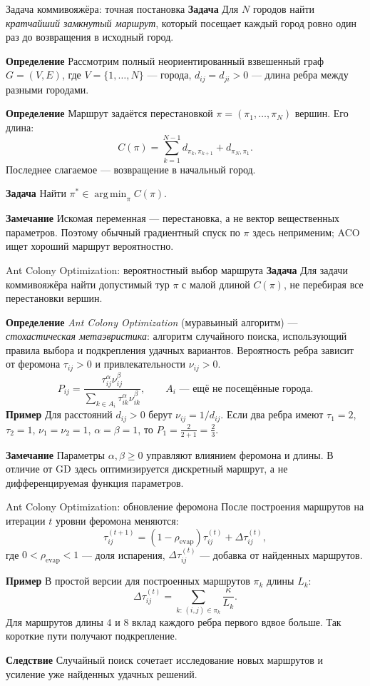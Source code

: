 \documentclass[10pt]{beamer}
\newcommand{\mlBody}{\normalsize}
\newcommand{\mlDefinition}{\textcolor{defblue}{\bfseries Определение}}
\newcommand{\mlRemark}{\textcolor{defblue}{\bfseries Замечание}}
\newcommand{\mlConsequence}{\textcolor{defblue}{\bfseries Следствие}}
\newcommand{\mlTask}{\textcolor{defblue}{\bfseries Задача}}
\newcommand{\mlExample}{\textcolor{defblue}{\bfseries Пример}}
\begin{document}
\begin{frame}{Задача коммивояжёра: точная постановка}
\mlBody
\mlTask\; Для $N$ городов найти \emph{кратчайший замкнутый маршрут},
который посещает каждый город ровно один раз до возвращения
в исходный город.

\mlDefinition\; Рассмотрим полный неориентированный взвешенный граф
$G=(V,E)$, где $V=\{1,\ldots,N\}$ --- города,
$d_{ij}=d_{ji}>0$ --- длина ребра между разными городами.

\mlDefinition\; Маршрут задаётся перестановкой
$\pi=(\pi_1,\ldots,\pi_N)$ вершин. Его длина:
\[
 \boxed{C(\pi)=\sum_{k=1}^{N-1}d_{\pi_k,\pi_{k+1}}
             +d_{\pi_N,\pi_1}}.
\]
Последнее слагаемое --- возвращение в начальный город.

\mlTask\; Найти $\pi^*\in\operatorname*{arg\,min}_{\pi}C(\pi)$.

\mlRemark\; Искомая переменная --- перестановка, а не вектор
вещественных параметров. Поэтому обычный градиентный спуск
по $\pi$ здесь неприменим; ACO ищет хороший маршрут вероятностно.
\end{frame}

\begin{frame}{Ant Colony Optimization: вероятностный выбор маршрута}
\mlBody
\mlTask\; Для задачи коммивояжёра найти допустимый тур $\pi$
с малой длиной $C(\pi)$, не перебирая все перестановки вершин.

\mlDefinition\; \textit{Ant Colony Optimization} (муравьиный алгоритм)
--- \emph{стохастическая метаэвристика}: алгоритм случайного поиска,
использующий правила выбора и подкрепления удачных вариантов.
Вероятность ребра зависит от феромона $\tau_{ij}>0$ и
привлекательности $\nu_{ij}>0$.
\[
 \boxed{P_{ij}=\frac{\tau_{ij}^{\alpha}\nu_{ij}^{\beta}}{\sum_{k\in A_i}\tau_{ik}^{\alpha}\nu_{ik}^{\beta}}},
 \qquad A_i\text{ --- ещё не посещённые города}.
\]
\mlExample\; Для расстояний $d_{ij}>0$ берут $\nu_{ij}=1/d_{ij}$.
Если два ребра имеют $\tau_1=2$, $\tau_2=1$,
$\nu_1=\nu_2=1$, $\alpha=\beta=1$, то
$P_1=\frac{2}{2+1}=\frac23$.

\mlRemark\; Параметры $\alpha,\beta\ge0$ управляют влиянием феромона и длины. В отличие от GD здесь оптимизируется дискретный маршрут, а не дифференцируемая функция параметров.
\end{frame}

\begin{frame}{Ant Colony Optimization: обновление феромона}
\mlBody
После построения маршрутов на итерации $t$ уровни феромона меняются:
\[
 \boxed{\tau_{ij}^{(t+1)}=(1-\rho_{\mathrm{evap}})\tau_{ij}^{(t)}+\Delta\tau_{ij}^{(t)}},
\]
где $0<\rho_{\mathrm{evap}}<1$ --- доля испарения, $\Delta\tau_{ij}^{(t)}$ --- добавка от найденных маршрутов.

\mlExample\; В простой версии для построенных маршрутов
$\pi_k$ длины $L_k$:
\[
 \Delta\tau_{ij}^{(t)}=
 \sum_{k:\,(i,j)\in\pi_k}\frac{\kappa}{L_k}.
\]
Для маршрутов длины $4$ и $8$ вклад каждого ребра первого
вдвое больше. Так короткие пути получают подкрепление.

\mlConsequence\; Случайный поиск сочетает исследование новых маршрутов и усиление уже найденных удачных решений.
\end{frame}
\end{document}
